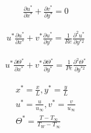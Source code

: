 \begin{minipage}{0.22\linewidth}
    \begin{align*}
        \frac{\partial u^*}{\partial x^*} + \frac{\partial v^*}{\partial y^*} = 0
    \end{align*}
\end{minipage}
\begin{minipage}{0.25\linewidth}
    \begin{align*}
        u^* \frac{\partial u^*}{\partial x^*} + v^* \frac{\partial u^*}{\partial y^*} = \frac{1}{Re} \frac{\partial^2 u^*}{\partial y^{*2}}
    \end{align*}
\end{minipage}
\begin{minipage}{0.28\linewidth}
    \begin{align*}
        u^* \frac{\partial \Theta^*}{\partial x^*} + v^* \frac{\partial \Theta^*}{\partial y^*} = \frac{1}{Pe} \frac{\partial^2 \Theta^*}{\partial y^{*2}}
    \end{align*}
\end{minipage}
\begin{minipage}{0.2\linewidth}
    \begin{scriptsize}
        \begin{align*}
            x^* = \frac{x}{L}, y^* = \frac{y}{L}\\
            u^* = \frac{u}{u_{\infty}}, v^* = \frac{v}{u_{\infty}}\\
            \Theta^* = \frac{T - T_{\infty}}{T_W - T_{\infty}}
        \end{align*}
    \end{scriptsize}
\end{minipage}